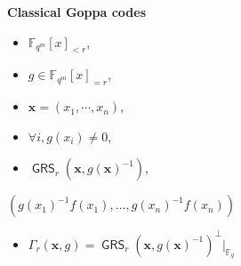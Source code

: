 \documentclass[
10pt, %
%
aspectratio=169, %
]{beamer}
\theoremstyle{plain}%
\theoremstyle{definition}
\theoremstyle{remark}
\newcommand{\fqm}{\mathbb{F}_{q^m}}
\newcommand{\fq}{\mathbb{F}_{q}}
\newcommand{\GRS}{\operatorname{\mathsf{GRS}}}
\begin{document}
\begin{frame}
\begin{columns}[c]
\begin{column}{0.3\textwidth}
		\textcolor{ballblue}{\textbf{Classical Goppa codes}}\\
		\vskip1cm
		\begin{itemize}
			\item $\fqm[x]_{<r}$,
			\item $g \in \fqm[x]_{= r}$,
			\item $\mathbf{x}=(x_1,\cdots,x_n)$,
			\item $\forall i, g(x_i)\neq 0$,
			\item $\GRS_r(\mathbf{x}, g(\mathbf{x})^{-1})$,
		\end{itemize}
	 \textcolor{ballblue}{$(g(x_1)^{-1}f(x_1),\dots,g(x_n)^{-1}f(x_n)) $}
	 \begin{itemize}
	 	\item $\Gamma_r(\mathbf{x},g)= \GRS_r(\mathbf{x},g(\mathbf{x})^{-1})^\perp|_{\fq}$
	 \end{itemize}
 \vspace{3em}
	\end{column}
\end{columns}
\end{frame}
\end{document}
